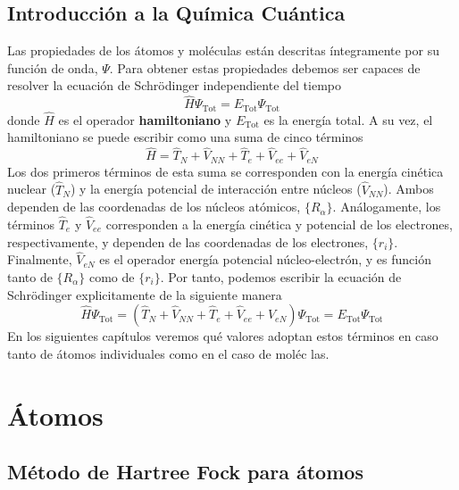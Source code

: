 \documentclass{tufte-book}
\begin{document}
\section{Introducción a la Química Cuántica}
Las propiedades de los átomos y moléculas están descritas
íntegramente por su función de onda, $\Psi$. Para obtener estas 
propiedades debemos ser capaces de resolver la ecuación 
de Schrödinger independiente del tiempo
\begin{equation}
    \hat{H}\Psi_\mathrm{Tot}=E_\mathrm{Tot}\Psi_\mathrm{Tot} 
\end{equation}
donde $\hat{H}$ es el operador \textbf{hamiltoniano} y
$E_\mathrm{Tot}$ es la energía total. A su vez, el 
hamiltoniano se puede escribir como una suma de cinco términos
\begin{equation}
    \hat{H} = \hat{T}_N + \hat{V}_{NN} + \hat{T}_e + \hat{V}_{ee} +\hat{V}_{eN}
\end{equation}
Los dos primeros términos de esta suma se corresponden con la 
energía cinética nuclear ($\hat{T}_N$) y la energía potencial de
interacción entre núcleos ($\hat{V}_{NN}$). Ambos dependen de las
coordenadas de los núcleos atómicos, $\{R_\alpha\}$. Análogamente, 
los términos $\hat{T}_e $ y $\hat{V}_{ee}$ corresponden a la 
energía cinética y potencial de los electrones, respectivamente, y
dependen de las coordenadas de los electrones, $\{r_i\}$.
Finalmente, $\hat{V}_{eN}$ es el operador energía potencial
núcleo-electrón, y es función tanto de $\{R_\alpha\}$ como de 
$\{r_i\}$. Por tanto, podemos escribir la ecuación de Schrödinger
explicitamente de la siguiente manera
\begin{equation}
    \hat{H}\Psi_\mathrm{Tot}   =
    (\hat{T}_N + \hat{V}_{NN} + \hat{T}_e + \hat{V}_{ee} +\hat{V}_{eN})\Psi_\mathrm{Tot} 
    = E_\mathrm{Tot}\Psi_\mathrm{Tot}
    \label{eq:hamilt_terms}
\end{equation}
En los siguientes capítulos veremos qué valores adoptan
estos términos en caso tanto de átomos individuales
como en el caso de moléc
las.

\chapter{Átomos}
\section{Método de Hartree Fock para átomos}
\end{document}
